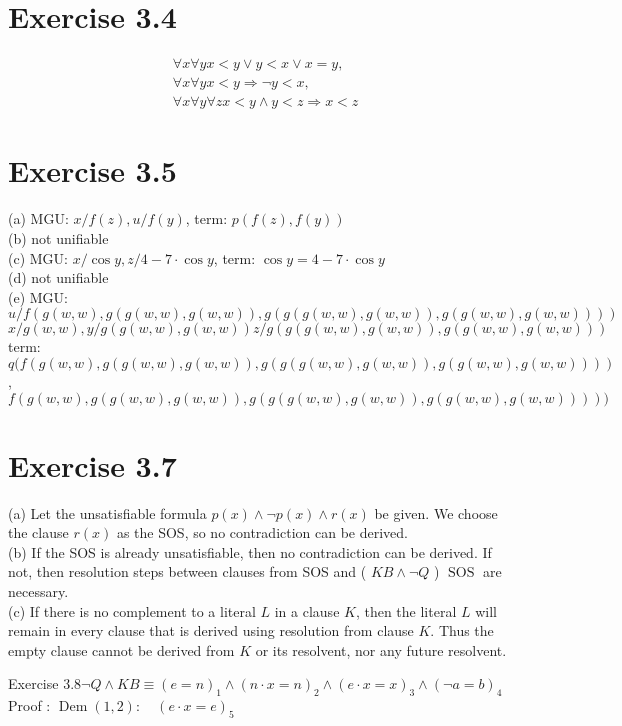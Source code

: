 \documentclass[10pt]{article}
\begin{document}
\section*{Exercise 3.4}
$$
\begin{aligned}
& \forall x \forall y x<y \vee y<x \vee x=y, \\
& \forall x \forall y x<y \Rightarrow \neg y<x, \\
& \forall x \forall y \forall z x<y \wedge y<z \Rightarrow x<z
\end{aligned}
$$

\section*{Exercise 3.5}
(a) MGU: $x / f(z), u / f(y)$, term: $p(f(z), f(y))$\\
(b) not unifiable\\
(c) MGU: $x / \cos y, z / 4-7 \cdot \cos y$, term: $\cos y=4-7 \cdot \cos y$\\
(d) not unifiable\\
(e) MGU: $u / f(g(w, w), g(g(w, w), g(w, w)), g(g(g(w, w), g(w, w)), g(g(w, w), g(w, w))))$ $x / g(w, w), y / g(g(w, w), g(w, w)) z / g(g(g(w, w), g(w, w)), g(g(w, w), g(w, w)))$ term: $q(f(g(w, w), g(g(w, w), g(w, w)), g(g(g(w, w), g(w, w)), g(g(w, w), g(w, w))))$, $f(g(w, w), g(g(w, w), g(w, w)), g(g(g(w, w), g(w, w)), g(g(w, w), g(w, w)))))$

\section*{Exercise 3.7}
(a) Let the unsatisfiable formula $p(x) \wedge \neg p(x) \wedge r(x)$ be given. We choose the clause $r(x)$ as the SOS, so no contradiction can be derived.\\
(b) If the SOS is already unsatisfiable, then no contradiction can be derived. If not, then resolution steps between clauses from SOS and ( $K B \wedge \neg Q$ ) $\operatorname{SOS}$ are necessary.\\
(c) If there is no complement to a literal $L$ in a clause $K$, then the literal $L$ will remain in every clause that is derived using resolution from clause $K$. Thus the empty clause cannot be derived from $K$ or its resolvent, nor any future resolvent.

Exercise $3.8 \neg Q \wedge K B \equiv(e=n)_{1} \wedge(n \cdot x=n)_{2} \wedge(e \cdot x=x)_{3} \wedge(\neg a=b)_{4}$\\
Proof : $\operatorname{Dem}(1,2): \quad(e \cdot x=e)_{5}$
\end{document}

